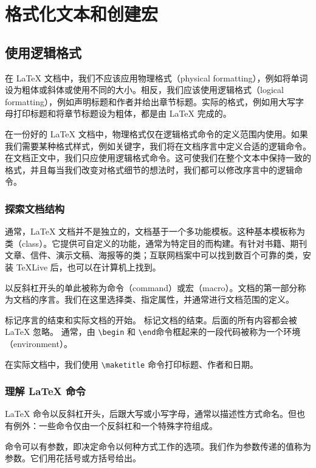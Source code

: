 \chapter{格式化文本和创建宏}
\section{使用逻辑格式}
在 {\LaTeX} 文档中，我们不应该应用物理格式（physical formatting），例如将单词设为粗体或斜体或使用不同的大小。相反，我们应该使用逻辑格式（logical formatting），例如声明标题和作者并给出章节标题。实际的格式，例如用大写字母打印标题和将章节标题设为粗体，都是由 {\LaTeX} 完成的。

在一份好的 {\LaTeX} 文档中，物理格式仅在逻辑格式命令的定义范围内使用。如果我们需要某种格式样式，例如关键字，我们将在文档序言中定义合适的逻辑命令。在文档正文中，我们只应使用逻辑格式命令。这可使我们在整个文本中保持一致的格式，并且每当我们改变对格式细节的想法时，我们都可以修改序言中的逻辑命令。
\subsection{探索文档结构}
通常，{\LaTeX} 文档并不是独立的，文档基于一个多功能模板。这种基本模板称为类（class）。它提供可自定义的功能，通常为特定目的而构建。有针对书籍、期刊文章、信件、演示文稿、海报等的类；互联网档案中可以找到数百个可靠的类，安装 TeXLive 后，也可以在计算机上找到。

以反斜杠开头的单此被称为命令（command）或宏（macro）。文档的第一部分称为文档的序言。我们在这里选择类、指定属性，并通常进行文档范围的定义。

\verb|| 标记序言的结束和实际文档的开始。 \verb|| 标记文档的结束。后面的所有内容都会被 {\LaTeX} 忽略。 通常，由 \verb|\begin| 和 \verb|\end|命令框起来的一段代码被称为一个环境（environment）。

在实际文档中，我们使用 \verb|\maketitle| 命令打印标题、作者和日期。
\subsection{理解 {\LaTeX} 命令}
{\LaTeX} 命令以反斜杠开头，后跟大写或小写字母，通常以描述性方式命名。但也有例外：一些命令仅由一个反斜杠和一个特殊字符组成。

命令可以有参数，即决定命令以何种方式工作的选项。我们作为参数传递的值称为参数。它们用花括号或方括号给出。

